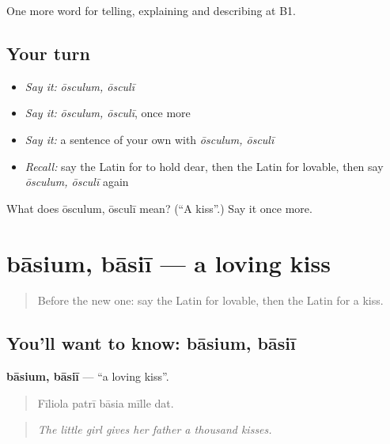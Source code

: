 \begin{grammarlens}[title={What you've built}]
One more word for telling, explaining and describing at B1.
\end{grammarlens}

\subsection*{Your turn}
\begin{itemize}
\raggedright
  \item \emph{Say it:} \emph{ōsculum, ōsculī}
  \item \emph{Say it:} \emph{ōsculum, ōsculī}, once more
  \item \emph{Say it:} a sentence of your own with \emph{ōsculum, ōsculī}
  \item \emph{Recall:} say the Latin for to hold dear, then the Latin for lovable, then say \emph{ōsculum, ōsculī} again
\end{itemize}

\begin{tcolorbox}[breakable,colback=teal!4,colframe=teal!35!black,title={Before you move on}]
What does ōsculum, ōsculī mean? (\textquotedblleft{}A kiss\textquotedblright{}.) Say it once more.
\end{tcolorbox}
\section[bāsium, bāsiī]{bāsium, bāsiī — a loving kiss}

\label{lesson:LA-C534-basium}



\begin{quote}
Before the new one: say the Latin for lovable, then the Latin for a kiss.
\end{quote}

\subsection*{You'll want to know: bāsium, bāsiī}
\textbf{bāsium, bāsiī} — \textquotedblleft{}a loving kiss\textquotedblright{}.

\begin{quote}
Fīliola patrī bāsia mīlle dat.
\end{quote}

\begin{quote}
\emph{The little girl gives her father a thousand kisses.}
\end{quote}

